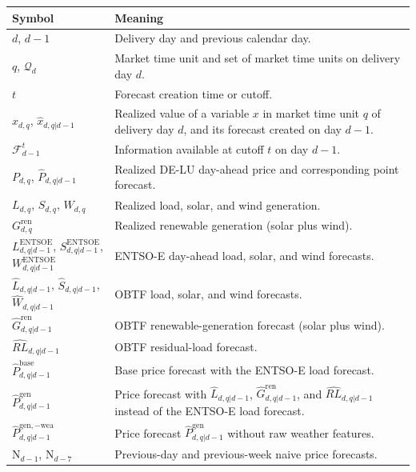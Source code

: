 \begin{center}
\small
\begin{tabular}{@{}>{\raggedright\arraybackslash}p{}
                >{\raggedright\arraybackslash}p{}@{}}
  \toprule
  Symbol & Meaning \\
  \midrule
  \(d\), \(d-1\)
  & Delivery day and previous calendar day. \\
  \addlinespace
  \(q\), \(\mathcal{Q}_d\)
  & Market time unit and set of market time units on delivery day \(d\). \\
  \addlinespace
  \(t\)
  & Forecast creation time or cutoff. \\
  \addlinespace
  \(x_{d,q}\), \(\hat{x}_{d,q|d-1}\)
  & Realized value of a variable \(x\) in market time unit \(q\) of delivery day
    \(d\), and its forecast created on day \(d-1\). \\
  \addlinespace
  \(\mathcal{F}_{d-1}^{t}\)
  & Information available at cutoff \(t\) on day \(d-1\). \\
  \addlinespace
  \(P_{d,q}\), \(\hat{P}_{d,q|d-1}\)
  & Realized \mbox{DE-LU} day-ahead price and corresponding point forecast. \\
  \addlinespace
  \(L_{d,q}\), \(S_{d,q}\), \(W_{d,q}\)
  & Realized load, solar, and wind generation. \\
  \addlinespace
  \(G^{\mathrm{ren}}_{d,q}\)
  & Realized renewable generation (solar plus wind). \\
  \addlinespace
  \(L^{\mathrm{ENTSOE}}_{d,q|d-1}\),
  \(S^{\mathrm{ENTSOE}}_{d,q|d-1}\),
  \(W^{\mathrm{ENTSOE}}_{d,q|d-1}\)
  & \mbox{ENTSO-E} day-ahead load, solar, and wind forecasts. \\
  \addlinespace
  \(\hat{L}_{d,q|d-1}\), \(\hat{S}_{d,q|d-1}\),
  \(\hat{W}_{d,q|d-1}\)
  & OBTF load, solar, and wind forecasts. \\
  \addlinespace
  \(\hat{G}^{\mathrm{ren}}_{d,q|d-1}\)
  & OBTF renewable-generation forecast (solar plus wind). \\
  \addlinespace
  \(\widehat{RL}_{d,q|d-1}\)
  & OBTF residual-load forecast. \\
  \addlinespace
  \(\hat{P}^{\mathrm{base}}_{d,q|d-1}\)
  & Base price forecast with the \mbox{ENTSO-E} load forecast. \\
  \addlinespace
  \(\hat{P}^{\mathrm{gen}}_{d,q|d-1}\)
  & Price forecast with \(\hat{L}_{d,q|d-1}\),
    \(\hat{G}^{\mathrm{ren}}_{d,q|d-1}\), and
    \(\widehat{RL}_{d,q|d-1}\) instead of the \mbox{ENTSO-E} load forecast. \\
  \addlinespace
  \(\hat{P}^{\mathrm{gen},-\mathrm{wea}}_{d,q|d-1}\)
  & Price forecast \(\hat{P}^{\mathrm{gen}}_{d,q|d-1}\) without raw weather features. \\
  \addlinespace
  \(\mathrm{N}_{d-1}\), \(\mathrm{N}_{d-7}\)
  & Previous-day and previous-week naive price forecasts. \\
  \bottomrule
\end{tabular}
\end{center}

